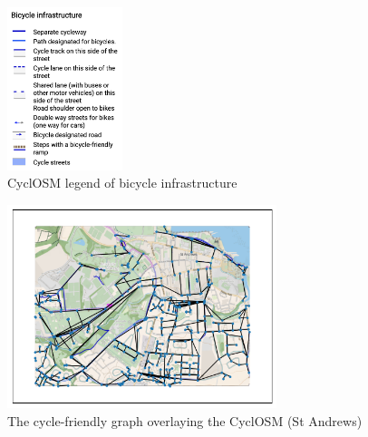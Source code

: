 \documentclass[12pt,a4paper]{report}
\begin{document}
\begin{figure}[ht!]
    \centering
    \includegraphics[width=0.3\textwidth]{diss_images/eval/cyclosm_legend.png}
    \caption{CyclOSM legend of bicycle infrastructure}
    \label{fig:cyclosm legend}
\end{figure}

\begin{figure}[ht]
    \centering
    \includegraphics[width=0.7\textwidth,trim={1cm 1cm 1cm 1cm},clip]{diss_images/eval/overlay_st_andrews.png}
    \caption{The cycle-friendly graph overlaying the CyclOSM (St Andrews)}
    \label{fig:overlay st andrews}
\end{figure}
\end{document}
